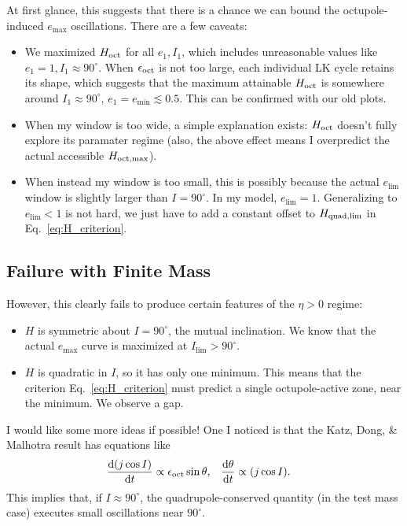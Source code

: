 \documentclass[11pt,
        usenames, %
        dvipsnames %
    ]{article}
\newcommand*{\rd}[2]{\frac{\mathrm{d}#1}{\mathrm{d}#2}}
\begin{document}
At first glance, this suggests that there is a chance we can bound the
octupole-induced $e_{\max}$ oscillations. There are a few caveats:
\begin{itemize}
    \item We maximized $H_{\rm oct}$ for all $e_1, I_1$, which includes
        unreasonable values like $e_1 = 1, I_1 \approx 90^\circ$. When
        $\epsilon_{\rm oct}$ is not too large, each individual LK cycle retains
        its shape, which suggests that the maximum attainable $H_{\rm oct}$ is
        somewhere around $I_1 \approx 90^\circ$, $e_1 = e_{\min} \lesssim 0.5$.
        This can be confirmed with our old plots.

    \item When my window is too wide, a simple explanation exists: $H_{\rm oct}$
        doesn't fully explore its paramater regime (also, the above effect means
        I overpredict the actual accessible $H_{\rm oct, \max}$).

    \item When instead my window is too small, this is possibly because the
        actual $e_{\lim}$ window is slightly larger than $I = 90^\circ$. In my
        model, $e_{\lim} = 1$. Generalizing to $e_{\lim} < 1$ is not hard, we
        just have to add a constant offset to $H_{\rm quad, \lim}$ in
        Eq.~\eqref{eq:H_criterion}.
\end{itemize}

\subsection{Failure with Finite Mass}

However, this clearly fails to produce certain features of the $\eta > 0$
regime:
\begin{itemize}
    \item $H$ is symmetric about $I = 90^\circ$, the mutual inclination. We know
        that the actual $e_{\max}$ curve is maximized at $I_{\lim} >
        90^\circ$.

    \item $H$ is quadratic in $I$, so it has only one minimum. This means that
        the criterion Eq.~\eqref{eq:H_criterion} must predict a single
        octupole-active zone, near the minimum. We observe a gap.
\end{itemize}

I would like some more ideas if possible! One I noticed is that the Katz, Dong,
\& Malhotra result has equations like
\begin{align}
    \rd{(j \cos I)}{t} &\propto \epsilon_{\rm oct} \sin \theta, &
    \rd{\theta}{t} &\propto (j \cos I).
\end{align}
This implies that, if $I \approx 90^\circ$, the quadrupole-conserved quantity
(in the test mass case) executes small oscillations near $90^\circ$.
\end{document}
